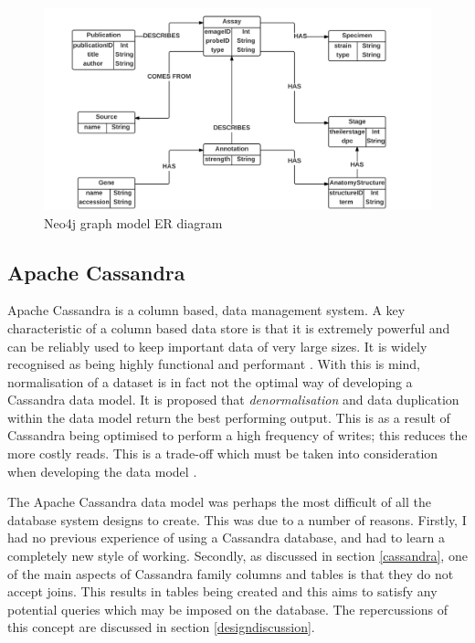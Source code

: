 \begin{figure}[H]\begin{center}\includegraphics[width=1\linewidth]{images/neo4j_model_er}\caption{Neo4j graph model ER diagram}\label{fig:neo1}\end{center}\end{figure}
\newpage
\subsection{Apache Cassandra}
Apache Cassandra is a column based, data management system. A key characteristic of a column based data store is that it is extremely powerful and can be reliably used to keep important data of very large sizes. It is widely recognised as being highly functional and performant \cite{cassandra}. With this is mind, normalisation of a dataset is in fact not the optimal way of developing a Cassandra data model. It is proposed that \textit{denormalisation} and data duplication within the data model return the best performing output. This is as a result of Cassandra being optimised to perform a high frequency of writes; this reduces the more costly reads. This is a trade-off which must be taken into consideration when developing the data model \cite{cassandra}.

The Apache Cassandra data model was perhaps the most difficult of all the database system designs to create. This was due to a number of reasons. Firstly, I had no previous experience of using a Cassandra database, and had to learn a completely new style of working. Secondly, as discussed in section \ref{cassandra}, one of the main aspects of Cassandra family columns and tables is that they do not accept joins. This results in tables being created and this aims to satisfy any potential queries which may be imposed on the database. The repercussions of this concept are discussed in section \ref{designdiscussion}.

